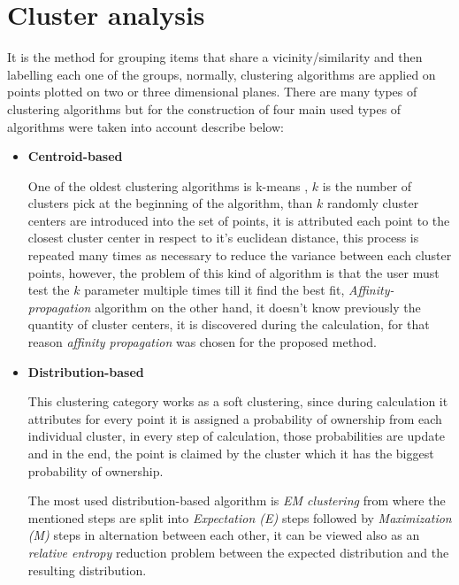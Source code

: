\documentclass[ecp,tc,english]{iiufrgs}
\begin{document}
        \section{Cluster analysis} \label{cluster_analysis}
        It is the method for grouping items that share a vicinity/similarity and then labelling each one of the groups, normally, clustering algorithms are applied on points plotted on two or three dimensional planes. There are many types of clustering algorithms but for the construction of four main used types of algorithms were taken into account describe below:
        
        \begin{itemize} 
            \item \textbf{Centroid-based}
            
            One of the oldest clustering algorithms is k-means \cite{steinhaus1956, macqueen1967}, \(k\) is the number of clusters pick at the beginning of the algorithm, than \(k\) randomly cluster centers are introduced into the set of points, it is attributed each point to the closest cluster center in respect to it's euclidean distance, this process is repeated many times as necessary to reduce the variance between each cluster points, however, the problem of this kind of algorithm is that the user must test the \(k\) parameter multiple times till it find the best fit, \textit{Affinity-propagation} algorithm  \cite{frey2007} on the other hand, it doesn't know previously the quantity of cluster centers, it is discovered during the calculation, for that reason \textit{affinity propagation} was chosen for the proposed method. 
            
            \item \textbf{Distribution-based} 
            
            This clustering category works as a soft clustering, since during calculation it attributes for every point it is assigned a probability of ownership from each individual cluster, in every step of calculation, those probabilities are update and in the end, the point is claimed by the cluster which it has the biggest probability of ownership.
            
            The most used distribution-based algorithm is \textit{EM clustering} from \cite{dempster1977} where the mentioned steps are split into \textit{Expectation (E)} steps followed by \textit{Maximization (M)} steps in alternation between each other, it can be viewed also as an \textit{relative entropy} reduction problem \cite{kullback1951} between the expected distribution and the resulting distribution.
            

\end{itemize}
\end{document}
